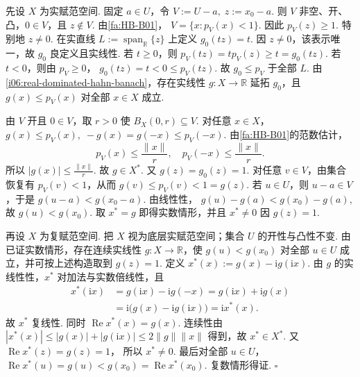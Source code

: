 \begin{FAProof}
先设 \(\displaystyle X\) 为实赋范空间. 固定 \(\displaystyle a\in U\)，令 \(\displaystyle V:=U-a, \; z:=x_0-a\).
则 \(\displaystyle V\) 非空、开、凸，\(\displaystyle0\in V\)，且 \(\displaystyle z\notin V\). 由\autoref{fa:HB-B01}， \(\displaystyle V=\{x:p_V(x)<1\}\).
因此 \(\displaystyle p_V(z)\geqslant1\). 特别地 \(\displaystyle z\neq0\). 在实直线 \(\displaystyle L:=\operatorname{span}_{\mathbb R}\{z\}\)
上定义 \(\displaystyle g_0(tz)=t\). 因 \(\displaystyle z\neq0\)，该表示唯一，故 \(\displaystyle g_0\) 良定义且实线性. 若 \(\displaystyle t\geqslant0\)，则 \(\displaystyle p_V(tz)=t p_V(z)\geqslant t=g_0(tz)\).
若 \(\displaystyle t<0\)，则由 \(\displaystyle p_V\geqslant0\)， \(\displaystyle g_0(tz)=t<0\leqslant p_V(tz)\).
故 \(\displaystyle g_0\leqslant p_V\) 于全部 \(\displaystyle L\). 由\autoref{i06:real-dominated-hahn-banach}，存在实线性 \(\displaystyle g:X\to\mathbb R\) 延拓 \(\displaystyle g_0\)，且 \(\displaystyle g(x)\leqslant p_V(x)\) 对全部 \(\displaystyle x\in X\) 成立.

由 \(\displaystyle V\) 开且 \(\displaystyle0\in V\)，取 \(\displaystyle r>0\) 使 \(\displaystyle B_X(0,r)\subseteq V\). 对任意 \(\displaystyle x\in X\)， \(\displaystyle g(x)\leqslant p_V(x), \; -g(x)=g(-x)\leqslant p_V(-x)\).
由\autoref{fa:HB-B01}的范数估计，
\[
p_V(x)\leqslant\frac{\|x\|}{r},
\quad
p_V(-x)\leqslant\frac{\|x\|}{r}.
\]
所以 \(\displaystyle |g(x)|\leqslant\frac{\|x\|}{r}\).
故 \(\displaystyle g\in X^*\). 又 \(\displaystyle g(z)=g_0(z)=1\). 对任意 \(\displaystyle v\in V\)，由集合恢复有 \(\displaystyle p_V(v)<1\)，从而 \(\displaystyle g(v)\leqslant p_V(v)<1=g(z)\).
若 \(\displaystyle u\in U\)，则 \(\displaystyle u-a\in V\)，于是 \(\displaystyle g(u-a)<g(x_0-a)\).
由线性性， \(\displaystyle g(u)-g(a)<g(x_0)-g(a)\),
故 \(\displaystyle g(u)<g(x_0)\).
取 \(\displaystyle x^*=g\) 即得实数情形，并且 \(\displaystyle x^*\neq0\) 因 \(\displaystyle g(z)=1\).

再设 \(\displaystyle X\) 为复赋范空间. 把 \(\displaystyle X\) 视为底层实赋范空间；集合 \(\displaystyle U\) 的开性与凸性不变. 由已证实数情形，存在连续实线性 \(\displaystyle g:X\to\mathbb R\)，使 \(\displaystyle g(u)<g(x_0)\)
对全部 \(\displaystyle u\in U\) 成立，并可按上述构造取到 \(\displaystyle g(z)=1\). 定义 \(\displaystyle x^*(x):=g(x)-\mathrm{i}g(\mathrm{i}x)\).
由 \(\displaystyle g\) 的实线性性，\(\displaystyle x^*\) 对加法与实数倍线性，且
\[
\begin{aligned}
x^*(\mathrm{i}x)
&=g(\mathrm{i}x)-\mathrm{i}g(-x)=g(\mathrm{i}x)+\mathrm{i}g(x)\\
&=\mathrm{i}\bigl(g(x)-\mathrm{i}g(\mathrm{i}x)\bigr)=\mathrm{i}x^*(x).
\end{aligned}
\]
故 \(\displaystyle x^*\) 复线性. 同时 \(\displaystyle \operatorname{Re}x^*(x)=g(x)\).
连续性由 \(\displaystyle |x^*(x)| \leqslant|g(x)|+|g(\mathrm{i}x)| \leqslant2\|g\|\|x\|\)
得到，故 \(\displaystyle x^*\in X^*\). 又 \(\displaystyle \operatorname{Re}x^*(z)=g(z)=1\)，
所以 \(\displaystyle x^*\neq0\). 最后对全部 \(\displaystyle u\in U\)， \(\displaystyle \operatorname{Re}x^*(u) =g(u) <g(x_0) =\operatorname{Re}x^*(x_0)\).
复数情形得证.
\hfill\(\square\)
\end{FAProof}

